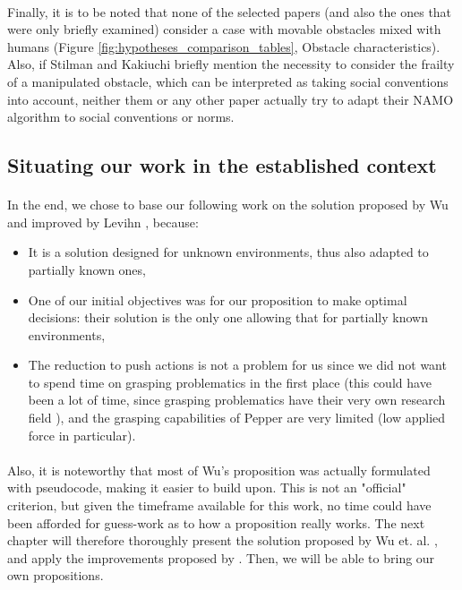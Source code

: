 \paragraph{} Finally, it is to be noted that none of the selected papers (and also the ones that were only briefly examined) consider a case with movable obstacles mixed with humans (Figure \ref{fig:hypotheses_comparison_tables}, Obstacle characteristics). Also, if Stilman \parencite{stilman_navigation_2005} and Kakiuchi \parencite{kakiuchi_working_2010} briefly mention the necessity to consider the frailty of a manipulated obstacle, which can be interpreted as taking social conventions into account, neither them or any other paper actually try to adapt their NAMO algorithm to social conventions or norms.

\subsection{Situating our work in the established context}

\paragraph{} In the end, we chose to base our following work on the solution proposed by Wu and improved by Levihn \parencite{wu_navigation_2010, levihn_locally_2014}, because:
\begin{itemize}
  \item It is a solution designed for unknown environments, thus also adapted to partially known ones,
  \item One of our initial objectives was for our proposition to make optimal decisions: their solution is the only one allowing that for partially known environments,
  \item The reduction to push actions is not a problem for us since we did not want to spend time on grasping problematics in the first place (this could have been a lot of time, since grasping problematics have their very own research field \parencite{sahbani_overview_2012}), and the grasping capabilities of Pepper are very limited (low applied force in particular).
\end{itemize}

\paragraph{}Also, it is noteworthy that most of Wu's proposition was actually formulated with pseudocode, making it easier to build upon. This is not an "official" criterion, but given the timeframe available for this work, no time could have been afforded for guess-work as to how a proposition really works. The next chapter will therefore thoroughly present the solution proposed by Wu et. al. \parencite{wu_navigation_2010}, and apply the improvements proposed by \parencite{levihn_locally_2014}. Then, we will be able to bring our own propositions.
